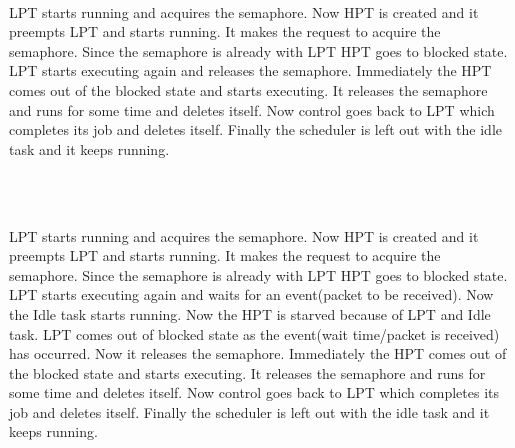 \begin{description}
\os{\newpage}



\item[{\rot\bf Priority Inversion}]~\\[-3ex]
\bi
\ite LPT starts running and acquires the semaphore.
\ite Now HPT is created and it preempts LPT and starts running. It makes the request to acquire the semaphore. Since the semaphore is already with LPT HPT goes to blocked state.
\ite LPT starts executing again and releases the semaphore.
\ite Immediately the HPT comes out of the blocked state and starts executing.
\ite It releases the semaphore and runs for some time and deletes itself.
\ite Now control goes back to LPT which completes its job and deletes itself.
\ite Finally the scheduler is left out with the idle task and it keeps running.
\ei

\os{\newpage}



\item[{\rot\bf Priority Inversion}]~\\[-3ex]

\os{\newpage}



\item[{\rot\bf Extended Priority Inversion}]~\\[-3ex]
\bi
\ite LPT starts running and acquires the semaphore.
\ite Now HPT is created and it preempts LPT and starts running. It makes the request to acquire the semaphore. Since the semaphore is already with LPT HPT goes to blocked state.
\ite LPT starts executing again and waits for an event(packet to be received).
\ite Now the Idle task starts running. Now the HPT is starved because of LPT and Idle task.
\ite LPT comes out of blocked state as the event(wait time/packet is received) has occurred. Now it releases the semaphore.
\ite Immediately the HPT comes out of the blocked state and starts executing. It releases the semaphore and runs for some time and deletes itself.
\ite Now control goes back to LPT which completes its job and deletes itself.
\ite Finally the scheduler is left out with the idle task and it keeps running.
\ei

\os{\newpage}



\item[{\rot\bf Extended Priority Inversion}]~\\[-3ex]

\os{\newpage}




\end{description}
